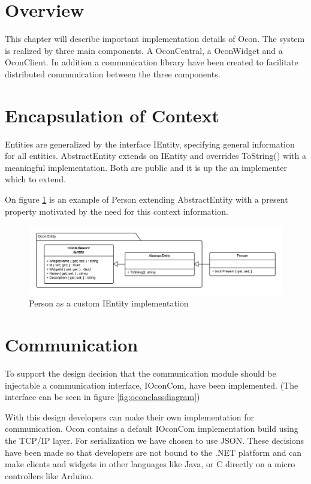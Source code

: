 \documentclass[../report.tex]{subfiles}
\begin{document}
\graphicspath{{img/}{../img/}}

\section{Overview}
This chapter will describe important implementation details of Ocon. The system is realized by three main components. A OconCentral, a OconWidget and a OconClient. In addition a communication library have been created to facilitate distributed communication between the three components.


\section{Encapsulation of Context}

Entities are generalized by the interface IEntity, specifying general information for all entities. AbstractEntity extends on IEntity and overrides ToString() with a meaningful implementation. Both are public and it is up the an implementer which to extend.

On figure \ref{fig:PersonImplementation} is an example of Person extending AbstractEntity with a present property motivated by the need for this context information.


\begin{figure}[H]
\includegraphics[width=\linewidth]{customEntityClass.png}
\caption{Person as a custom IEntity implementation}
\label{fig:PersonImplementation}
\end{figure}


\section{Communication}

To support the design decision that the communication module should be injectable a communication interface, IOconCom, have been implemented. (The interface can be seen in figure \ref{fig:oconclassdiagram})

With this design developers can make their own implementation for communication. Ocon contains a default IOconCom implementation build using the TCP/IP layer. For serialization we have chosen to use JSON. These decisions have been made so that developers are not bound to the .NET platform and can make clients and widgets in other languages like Java, or C directly on a micro controllers like Arduino.
\end{document}
